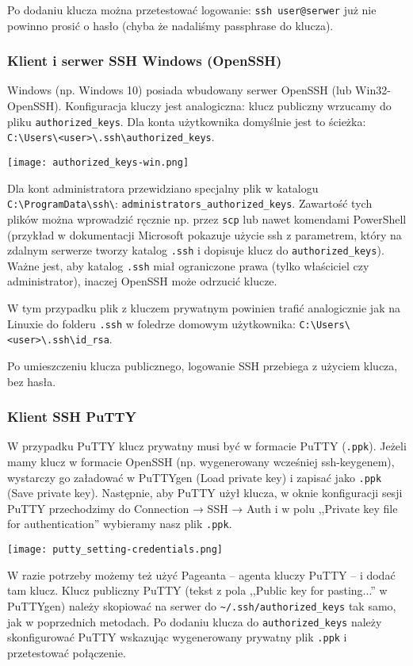 \documentclass{article}
\begin{document}
\begin{multicols}{2}
Po dodaniu klucza można przetestować logowanie: \verb|ssh user@serwer| już nie powinno prosić o hasło
(chyba że nadaliśmy passphrase do klucza).

\subsubsection{Klient i serwer SSH Windows (OpenSSH)}
Windows (np. Windows 10) posiada wbudowany serwer OpenSSH (lub Win32-OpenSSH). Konfiguracja kluczy jest analogiczna: klucz publiczny wrzucamy do pliku \verb|authorized_keys|. Dla konta użytkownika domyślnie jest to ścieżka: \verb|C:\Users\<user>\.ssh\authorized_keys|.

\noindent
\texttt{[image: authorized\_keys-win.png]}

Dla kont administratora przewidziano specjalny plik w katalogu \verb|C:\ProgramData\ssh\|: \verb|administrators_authorized_keys|. Zawartość tych plików można wprowadzić ręcznie np. przez \verb|scp| lub nawet komendami PowerShell (przykład w dokumentacji Microsoft pokazuje użycie ssh z parametrem, który na zdalnym serwerze tworzy katalog \verb|.ssh| i dopisuje klucz do \verb|authorized_keys|). Ważne jest, aby katalog \verb|.ssh| miał ograniczone prawa (tylko właściciel czy administrator), inaczej OpenSSH może odrzucić klucze.

W tym przypadku plik z kluczem prywatnym powinien trafić analogicznie jak na Linuxie do folderu \verb|.ssh| w foledrze domowym użytkownika: \verb|C:\Users\<user>\.ssh\id_rsa|.


Po umieszczeniu klucza publicznego, logowanie SSH przebiega z użyciem klucza, bez hasła.

\subsubsection{Klient SSH PuTTY}
W przypadku PuTTY klucz prywatny musi być w formacie PuTTY (\verb|.ppk|). Jeżeli mamy klucz w formacie OpenSSH (np. wygenerowany wcześniej ssh-keygenem), wystarczy go załadować w PuTTYgen (Load private key) i zapisać jako \verb|.ppk| (Save private key). Następnie, aby PuTTY użył klucza, w oknie konfiguracji sesji PuTTY przechodzimy do Connection → SSH → Auth i w polu ,,Private key file for authentication'' wybieramy nasz plik \verb|.ppk|.

\noindent
\texttt{[image: putty\_setting-credentials.png]}

W razie potrzeby możemy też użyć Pageanta -- agenta kluczy PuTTY -- i dodać tam klucz. Klucz publiczny PuTTY (tekst z pola ,,Public key for pasting...'' w PuTTYgen) należy skopiować na serwer do \verb|~/.ssh/authorized_keys| tak samo, jak w poprzednich metodach. Po dodaniu klucza do \verb|authorized_keys| należy skonfigurować PuTTY wskazując wygenerowany prywatny plik \verb|.ppk| i przetestować połączenie.

\end{multicols}
\end{document}
